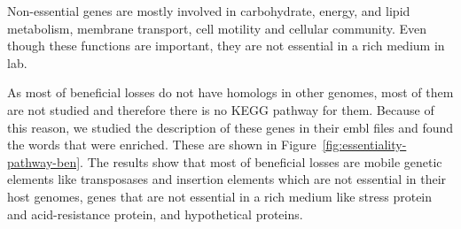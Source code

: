 \documentclass[12pt,letterpaper]{article}
\begin{document}
Non-essential genes are mostly involved in carbohydrate, energy, and lipid metabolism, membrane transport, cell motility and cellular community. Even though these functions are important, they are not essential in a rich medium in lab.

As most of beneficial losses do not have homologs in other genomes, most of them are not studied and therefore there is no KEGG pathway for them. Because of this reason, we studied the description of these genes in their embl files and found the words that were enriched. These are shown in Figure~\ref{fig:essentiality-pathway-ben}. The results show that most of beneficial losses are mobile genetic elements like transposases and insertion elements which are not essential in their host genomes, genes that are not essential in a rich medium like stress protein and acid-resistance protein, and hypothetical proteins.


\end{document}
